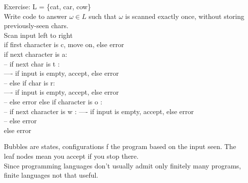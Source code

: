 \documentclass[12pt]{article}
\begin{document}
	Exercise: L = \{cat, car, cow\}\\
	Write code to answer $\omega \in L$ such that $\omega$ is scanned exactly once, without storing previously-seen chars.\\
	
	Scan input left to right\\
	if first character is c, move on, else error\\
	if next character is a: \\
	-- if next char is t : \\
	---- if input is empty, accept, else error\\
	-- else if char is r: \\
	---- if input is empty, accept, else error \\
	-- else error
	else if character is o : \\
	-- if next character is w :
	---- if input is empty, accept, else error \\
	-- else error\\
	else error\\
	
	\begin{center}\end{center}
	
	Bubbles are states, configurations f the program based on the input seen. The leaf nodes mean you accept if you stop there.\\
	
	Since programming languages don't usually admit only finitely many programs, finite languages not that useful.\\
\end{document}
